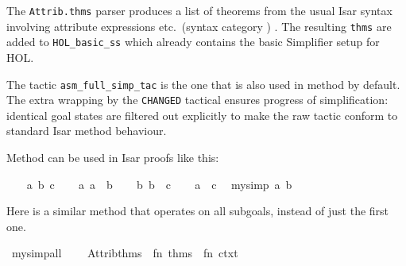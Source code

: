 \begin{isabellebody}
\begin{isamarkuptext}
  The \verb|Attrib.thms| parser produces a list of theorems from the
  usual Isar syntax involving attribute expressions etc.\ (syntax
  category \hyperlink{syntax.thmrefs}{\mbox{}}) \cite{isabelle-isar-ref}.  The resulting
  \verb|thms| are added to \verb|HOL_basic_ss| which already
  contains the basic Simplifier setup for HOL.

  The tactic \verb|asm_full_simp_tac| is the one that is also used in
  method \hyperlink{method.simp}{\mbox{}} by default.  The extra wrapping by the \verb|CHANGED| tactical ensures progress of simplification: identical goal
  states are filtered out explicitly to make the raw tactic conform to
  standard Isar method behaviour.

  \medskip Method \hyperlink{method.my-simp}{\mbox{}} can be used in Isar proofs like
  this:%
\end{isamarkuptext}%
\isamarkuptrue%
\isamarkupfalse%
\isanewline
%
\isadelimproof
\ \ %
\endisadelimproof
%
\isatagproof
{}\isamarkupfalse%
\ a\ b\ c\isanewline
\ \ \isamarkupfalse%
\ a{}\ {}a\ {}\ b{}\isanewline
\ \ \isamarkupfalse%
\ b{}\ {}b\ {}\ c{}\isanewline
\ \ \isamarkupfalse%
\ {}a\ {}\ c{}\ \isamarkupfalse%
\ {}my{}simp\ a\ b{}\isanewline
{}\isamarkupfalse%
%
\endisatagproof
{\isafoldproof}%
%
\isadelimproof
%
\endisadelimproof
%
\begin{isamarkuptext}%
Here is a similar method that operates on all subgoals,
  instead of just the first one.%
\end{isamarkuptext}%
\isamarkuptrue%
%
\isadelimML
%
\endisadelimML
%
\isatagML
{}\isamarkupfalse%
\ my{}simp{}all\ {}\ {}\isanewline
\ \ Attrib{}thms\ {}{}\ {}fn\ thms\ {}{}\ fn\ ctxt\ {}{}\isanewline

\end{isabellebody}
